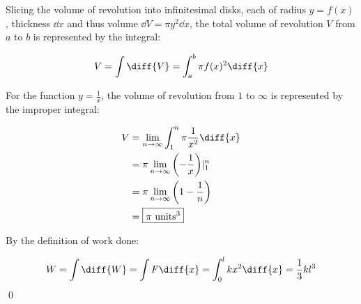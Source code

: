 \documentclass[12pt]{article}
\begin{document}

Slicing the volume of revolution into infinitesimal disks, each of radius $y = f(x)$, thickness $\dd{x}$ and thus volume $\dd{V} = \pi y^{2} \dd{x}$, the total volume of revolution $V$ from $a$ to $b$ is represented by the integral:

\begin{equation}
    V = \int \diff{V} = \int_{a}^{b} \pi f(x)^{2} \diff{x}
\end{equation}

For the function $y = \frac{1}{x}$, the volume of revolution from $1$ to $\infty$ is represented by the improper integral:

\begin{equation}
    \begin{split}
        V &= \lim_{n \to \infty} \int_{1}^{n} \pi \frac{1}{x^{2}} \diff{x} \\
        &= \pi \lim_{n \to \infty} \left( -\frac{1}{x} \right) \rvert_{1}^{n} \\
        &= \pi \lim_{n \to \infty} \left( 1 - \frac{1}{n} \right) \\
        &= \boxed{\pi \text{ units}^{3}}
    \end{split}
\end{equation}

By the definition of work done:

\begin{equation}
    W = \int \diff{W} = \int F \diff{x} = \int_{0}^{l} k x^{2} \diff{x} = \frac{1}{3} k l^{3}
\end{equation}
\qed
\end{document}
